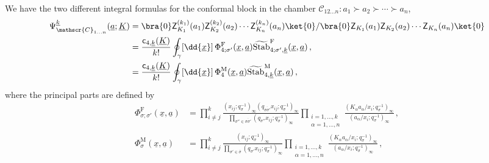 \begin{proposition}\label{prop:conf_block_A0^}
    We have the two different integral formulas for the conformal block in the chamber $\mathscr{C}_{12\ldots n}: a_1 \succ a_2 \succ \cdots \succ a_n$,
    \begin{subequations}
    \begin{align}
        \Psi_{\mathscr{C}_{1\ldots n}}^{\underline{k}}(\underline{a};\underline{K}) & = \bra{0} \mathsf{Z}^{(k_1)}_{K_1}(a_1) \mathsf{Z}^{(k_2)}_{K_2}(a_2) \cdots \mathsf{Z}^{(k_n)}_{K_n}(a_n) \ket{0} / \bra{0} \mathsf{Z}_{K_1}(a_1) \mathsf{Z}_{K_2}(a_2) \cdots \mathsf{Z}_{K_n}(a_n) \ket{0}
        \nonumber \\ 
        & = \frac{\mathsf{c}_{4,\underline{k}}(\underline{K})}{k!} \oint_\gamma [\dd{\underline{x}}] \, \Phi_{4;\sigma'}^\text{F}(\underline{x},\underline{a})\widetilde{\operatorname{Stab}}_{4;\sigma',\underline{k}}^\text{F}
        (\underline{x},\underline{a}) \, , \label{eq:block_A0^_F} \\
        & = \frac{\mathsf{c}_{4,\underline{k}}(\underline{K})}{k!} \oint_\gamma [\dd{\underline{x}}] \, \Phi_{4}^\text{M}(\underline{x},\underline{a})\widetilde{\operatorname{Stab}}_{4,\underline{k}}^\text{M}
        (\underline{x},\underline{a}) \label{eq:block_A0^_M} \, ,
    \end{align}
    \end{subequations}
    where the principal parts are defined by
    \begin{subequations}\label{eq:principal_part_A0^}
        \begin{align}
            \Phi_{\sigma;\sigma'}^\text{F}(\underline{x},\underline{a}) & = \prod_{i \neq j}^k \frac{(x_{ij};q_\sigma^{-1})_\infty (q_{\overline{\sigma \sigma'}} x_{ij};q_\sigma^{-1})_\infty}{\prod_{\sigma'' \in \overline{\sigma \sigma'}}(q_{\sigma''} x_{ij};q_\sigma^{-1})_\infty} \prod_{\substack{i=1,\ldots,k \\ \alpha=1,\ldots,n}} \frac{(K_\alpha a_\alpha/x_i;q_\sigma^{-1})_\infty}{( a_\alpha/x_i;q_\sigma^{-1})_\infty}
            \, , \\
            \Phi_\sigma^\text{M}(\underline{x},\underline{a}) & = \prod_{i \neq j}^k \frac{(x_{ij};q_\sigma^{-1})_\infty}{\prod_{\sigma' \in \overline{\sigma }}(q_{\sigma'} x_{ij};q_\sigma^{-1})_\infty} \prod_{\substack{i=1,\ldots,k \\ \alpha=1,\ldots,n}} \frac{(K_\alpha a_\alpha/x_i;q_\sigma^{-1})_\infty}{( a_\alpha/x_i;q_\sigma^{-1})_\infty} \, ,
        \end{align}

\end{subequations}
\end{proposition}
